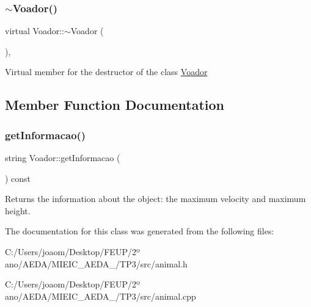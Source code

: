 \subsubsection{\texorpdfstring{$\sim$\+Voador()}{~Voador()}}
{\footnotesize\ttfamily virtual Voador\+::$\sim$\+Voador (\begin{DoxyParamCaption}{ }\end{DoxyParamCaption})\hspace{0.3cm}{\ttfamily [inline]}, {\ttfamily [virtual]}}

Virtual member for the destructor of the class \mbox{\hyperlink{class_voador}{Voador}} 

\subsection{Member Function Documentation}
\mbox{\label{class_voador_aabc57710b69459a3b1a41c3400ebc0a7}} 
\subsubsection{\texorpdfstring{get\+Informacao()}{getInformacao()}}
{\footnotesize\ttfamily string Voador\+::get\+Informacao (\begin{DoxyParamCaption}{ }\end{DoxyParamCaption}) const}

Returns the information about the object\+: the maximum velocity and maximum height. 

The documentation for this class was generated from the following files\+:\begin{DoxyCompactItemize}
\item 
C\+:/\+Users/joaom/\+Desktop/\+F\+E\+U\+P/2º ano/\+A\+E\+D\+A/\+M\+I\+E\+I\+C\+\_\+\+A\+E\+D\+A\+\_/\+T\+P3/src/animal.\+h\item 
C\+:/\+Users/joaom/\+Desktop/\+F\+E\+U\+P/2º ano/\+A\+E\+D\+A/\+M\+I\+E\+I\+C\+\_\+\+A\+E\+D\+A\+\_/\+T\+P3/src/animal.\+cpp\end{DoxyCompactItemize}
